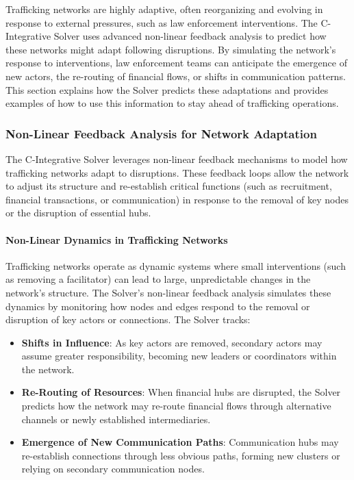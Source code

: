 \documentclass[%
 preprint, linenumbers,
 amsmath,amssymb,
 aps, physrev,
]{revtex4-2}
\begin{document}
Trafficking networks are highly adaptive, often reorganizing and evolving in response to external pressures, such as law enforcement interventions. The C-Integrative Solver uses advanced non-linear feedback analysis to predict how these networks might adapt following disruptions. By simulating the network’s response to interventions, law enforcement teams can anticipate the emergence of new actors, the re-routing of financial flows, or shifts in communication patterns. This section explains how the Solver predicts these adaptations and provides examples of how to use this information to stay ahead of trafficking operations.

\subsubsection{Non-Linear Feedback Analysis for Network Adaptation}

The C-Integrative Solver leverages non-linear feedback mechanisms to model how trafficking networks adapt to disruptions. These feedback loops allow the network to adjust its structure and re-establish critical functions (such as recruitment, financial transactions, or communication) in response to the removal of key nodes or the disruption of essential hubs.

\paragraph{Non-Linear Dynamics in Trafficking Networks}

Trafficking networks operate as dynamic systems where small interventions (such as removing a facilitator) can lead to large, unpredictable changes in the network’s structure. The Solver’s non-linear feedback analysis simulates these dynamics by monitoring how nodes and edges respond to the removal or disruption of key actors or connections. The Solver tracks:
\begin{itemize}
    \item \textbf{Shifts in Influence}: As key actors are removed, secondary actors may assume greater responsibility, becoming new leaders or coordinators within the network.
    \item \textbf{Re-Routing of Resources}: When financial hubs are disrupted, the Solver predicts how the network may re-route financial flows through alternative channels or newly established intermediaries.
    \item \textbf{Emergence of New Communication Paths}: Communication hubs may re-establish connections through less obvious paths, forming new clusters or relying on secondary communication nodes.
\end{itemize}
\end{document}
